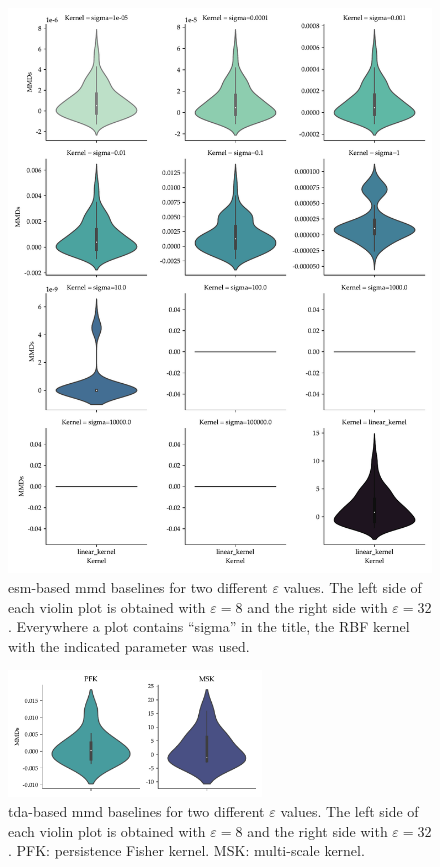\begin{figure}
  \centering
  \includegraphics[width=\textwidth]{./figures/results/esm_baselines.pdf}
  \caption[\acrshort{esm}-based \gls{mmd} baselines for two different
$\varepsilon$ values.]{\acrshort{esm}-based \gls{mmd} baselines for two
different $\varepsilon$ values. The left side of each violin plot is obtained
with $\varepsilon=8$ and the right side with $\varepsilon=32$. Everywhere a plot
contains ``sigma'' in the title, the RBF kernel with the indicated parameter was
used.}
\end{figure}

\begin{figure}
  \centering
  \includegraphics[width=0.6\textwidth]{./figures/results/tda_baselines.pdf}
  \caption[\gls{tda}-based \gls{mmd} baselines for two different
$\varepsilon$ values.]{\gls{tda}-based \gls{mmd} baselines for two
different $\varepsilon$ values. The left side of each violin plot is obtained
with $\varepsilon=8$ and the right side with $\varepsilon=32$. PFK: persistence
Fisher kernel. MSK: multi-scale kernel.}
\end{figure}


